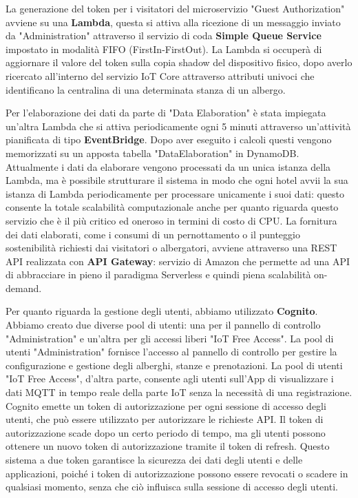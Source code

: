 La generazione del token per i visitatori del microservizio "Guest Authorization" avviene su una \textbf{Lambda}, questa si attiva alla ricezione di un messaggio inviato da "Administration" attraverso il servizio di coda \textbf{Simple Queue Service} impostato in modalità FIFO (FirstIn-FirstOut). La Lambda si occuperà di aggiornare il valore del token sulla copia shadow del dispositivo fisico, dopo averlo ricercato all'interno del servizio IoT Core attraverso attributi univoci che identificano la centralina di una determinata stanza di un albergo.

Per l'elaborazione dei dati da parte di "Data Elaboration" è stata impiegata un'altra Lambda che si attiva periodicamente ogni 5 minuti attraverso un'attività pianificata di tipo \textbf{EventBridge}. Dopo aver eseguito i calcoli questi vengono memorizzati su un apposta tabella "DataElaboration" in DynamoDB.
Attualmente i dati da elaborare vengono processati da un unica istanza della Lambda, ma è possibile strutturare il sistema in modo che ogni hotel avvii la sua istanza di Lambda periodicamente per processare unicamente i suoi dati: questo consente la totale scalabilità computazionale anche per quanto riguarda questo servizio che è il più critico ed oneroso in termini di costo di CPU.
La fornitura dei dati elaborati, come i consumi di un pernottamento o il punteggio sostenibilità richiesti dai visitatori o albergatori, avviene attraverso una REST API realizzata con \textbf{API Gateway}: servizio di Amazon che permette ad una API di abbracciare in pieno il paradigma Serverless e quindi piena scalabilità on-demand.

Per quanto riguarda la gestione degli utenti, abbiamo utilizzato \textbf{Cognito}. Abbiamo creato due diverse pool di utenti: una per il pannello di controllo "Administration" e un'altra per gli accessi liberi "IoT Free Access". La pool di utenti "Administration" fornisce l'accesso al pannello di controllo per gestire la configurazione e gestione degli alberghi, stanze e prenotazioni. La pool di utenti "IoT Free Access", d'altra parte, consente agli utenti sull'App di visualizzare i dati MQTT in tempo reale della parte IoT senza la necessità di una registrazione.
Cognito emette un token di autorizzazione per ogni sessione di accesso degli utenti, che può essere utilizzato per autorizzare le richieste API. Il token di autorizzazione scade dopo un certo periodo di tempo, ma gli utenti possono ottenere un nuovo token di autorizzazione tramite il token di refresh. Questo sistema a due token garantisce la sicurezza dei dati degli utenti e delle applicazioni, poiché i token di autorizzazione possono essere revocati o scadere in qualsiasi momento, senza che ciò influisca sulla sessione di accesso degli utenti. 

